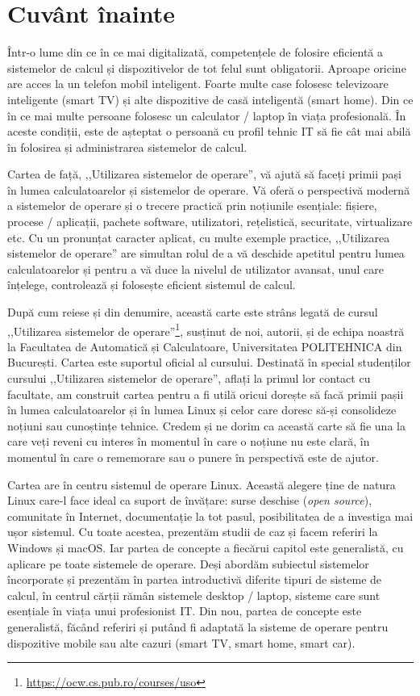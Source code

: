 \section*{Cuvânt înainte}

Într-o lume din ce în ce mai digitalizată, competențele de folosire eficientă a sistemelor de calcul și dispozitivelor de tot felul sunt obligatorii.
Aproape oricine are acces la un telefon mobil inteligent.
Foarte multe case folosesc televizoare inteligente (smart TV) și alte dispozitive de casă inteligentă (smart home).
Din ce în ce mai multe persoane folosesc un calculator / laptop în viața profesională.
În aceste condiții, este de așteptat o persoană cu profil tehnic IT să fie cât mai abilă în folosirea și administrarea sistemelor de calcul.

Cartea de față, ,,Utilizarea sistemelor de operare'', vă ajută să faceți primii pași în lumea calculatoarelor și sistemelor de operare.
Vă oferă o perspectivă modernă a sistemelor de operare și o trecere practică prin noțiunile esențiale: fișiere, procese / aplicații, pachete software, utilizatori, rețelistică, securitate, virtualizare etc.
Cu un pronunțat caracter aplicat, cu multe exemple practice, ,,Utilizarea sistemelor de operare'' are simultan rolul de a vă deschide apetitul pentru lumea calculatoarelor și pentru a vă duce la nivelul de utilizator avansat, unul care înțelege, controlează și folosește eficient sistemul de calcul.

După cum reiese și din denumire, această carte este strâns legată de cursul ,,Utilizarea sistemelor de operare''\footnote{\url{https://ocw.cs.pub.ro/courses/uso}}, susținut de noi, autorii, și de echipa noastră la Facultatea de Automatică și Calculatoare, Universitatea POLITEHNICA din București.
Cartea este suportul oficial al cursului.
Destinată în special studenților cursului ,,Utilizarea sistemelor de operare'', aflați la primul lor contact cu facultate, am construit cartea pentru a fi utilă oricui dorește să facă primii pașii în lumea calculatoarelor și în lumea Linux și celor care doresc să-și consolideze noțiuni sau cunoștințe tehnice.
Credem și ne dorim ca această carte să fie una la care veți reveni cu interes în momentul în care o noțiune nu este clară, în momentul în care o rememorare sau o punere în perspectivă este de ajutor.

Cartea are în centru sistemul de operare Linux.
Această alegere ține de natura Linux care-l face ideal ca suport de învățare: surse deschise (\textit{open source}), comunitate în Internet, documentație la tot pasul, posibilitatea de a investiga mai ușor sistemul.
Cu toate acestea, prezentăm studii de caz și facem referiri la Windows și macOS.
Iar partea de concepte a fiecărui capitol este generalistă, cu aplicare pe toate sistemele de operare.
Deși abordăm subiectul sistemelor încorporate și prezentăm în partea introductivă diferite tipuri de sisteme de calcul, în centrul cărții rămân sistemele desktop / laptop, sisteme care sunt esențiale în viața unui profesionist IT.
Din nou, partea de concepte este generalistă, făcând referiri și putând fi adaptată la sisteme de operare pentru dispozitive mobile sau alte cazuri (smart TV, smart home, smart car).

